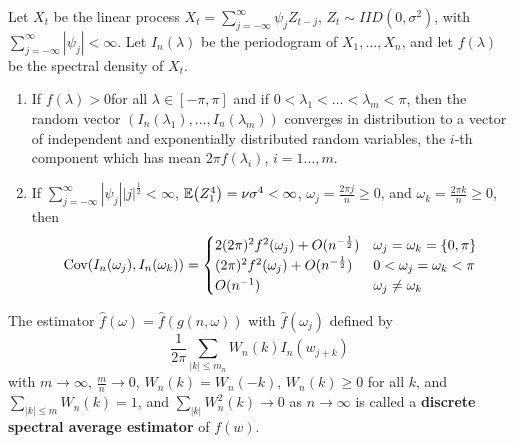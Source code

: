 \begin{thm}
  \label{sec:periodogram-4}
  Let $X_{t}$ be the linear process $X_{t} = \sum_{j=-\infty}^{\infty}
  \psi_{j} Z_{t-j}$, $Z_{t} \sim IID(0, \sigma^{2})$, with
  $\sum_{j=-\infty}^{\infty} |\psi_{j}| < \infty$. Let
  $I_{n}(\lambda)$ be the periodogram of $X_{1}, \dots, X_{n}$, and
  let $f(\lambda)$ be the spectral density of $X_{t}$.
  \begin{enumerate}
  \item If $f(\lambda) > 0$for all $\lambda \in [-\pi, \pi]$ and if $0
    < \lambda_{1} < \dots < \lambda_{m} < \pi$, then the random vector
    $(I_{n}(\lambda_{1}), \dots, I_{n}(\lambda_{m}))$ converges in
    distribution to a vector of independent and exponentially
    distributed random variables, the $i$-th component which has mean
    $2\pi f(\lambda_{i})$, $i = 1 \dots, m $.
  \item If $\sum_{j=-\infty}^{\infty} |\psi_{j}| |j|^{\frac{1}{2}} <
    \infty$, $\E{Z^{4}_{1}} = \nu \sigma^{4} < \infty$, $\omega_{j} =
    \frac{2 \pi j}{n} \geq 0$, and $\omega_{k} = \frac{2 \pi k}{n}
    \geq 0$, then
    \begin{align}
      \label{eq:75}
      \Cov{I_{n}(\omega_{j})}{I_{n}(\omega_{k})} =
      \begin{cases}
        2(2 \pi)^{2} f^{2}(\omega_{j}) + O(n^{-\frac{1}{2} }) &
        \omega_{j} = \omega_{k} = \{ 0, \pi \} \\
        (2 \pi)^{2} f^{2}(\omega_{j})+ O(n^{-\frac{1}{2} }) & 0 <
        \omega_{j} = \omega_{k} < \pi \\
        O(n^{-1}) & \omega_{j} \neq \omega_{k}
      \end{cases}
    \end{align}
  \end{enumerate}

\end{thm}

\begin{defn}
  \label{sec:periodogram-3}
  The estimator $\hat f(\omega) = \hat f(g(n, \omega))$ with $\hat
  f(\omega_{j})$ defined by
  \begin{equation}
    \frac{1}{2 \pi} \sum_{|k| \leq m_{n}}^{} W_{n}(k) I_{n}(w_{j+k})\label{eq:79}  
  \end{equation}
  with $m \rightarrow \infty$, $\frac{m}{n} \rightarrow 0$, $W_{n}(k)
  = W_{n}(-k)$, $W_{n}(k) \geq 0$ for all $k$, and $\sum_{|k| \leq
    m}^{} W_{n}(k) = 1$, and $\sum_{|k|}^{} W_{n}^{2}(k) \rightarrow
  0$ as $n \rightarrow \infty$ is called a \textbf{discrete spectral
    average estimator} of $f(w)$.
\end{defn}

